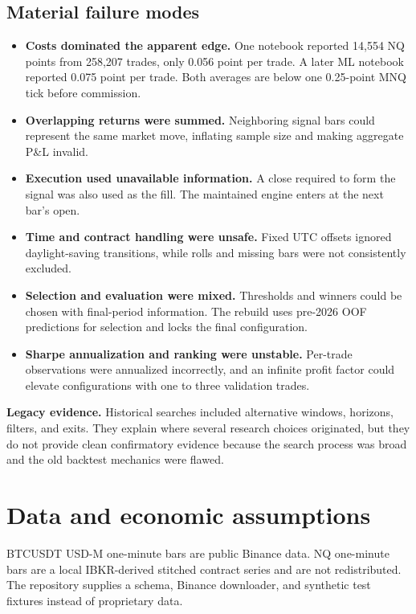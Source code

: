 \documentclass[10pt]{article}
\begin{document}
\subsection*{Material failure modes}
\begin{itemize}
  \item \textbf{Costs dominated the apparent edge.} One notebook reported 14,554 NQ points from 258,207 trades, only 0.056 point per trade. A later ML notebook reported 0.075 point per trade. Both averages are below one 0.25-point MNQ tick before commission.
  \item \textbf{Overlapping returns were summed.} Neighboring signal bars could represent the same market move, inflating sample size and making aggregate P\&L invalid.
  \item \textbf{Execution used unavailable information.} A close required to form the signal was also used as the fill. The maintained engine enters at the next bar's open.
  \item \textbf{Time and contract handling were unsafe.} Fixed UTC offsets ignored daylight-saving transitions, while rolls and missing bars were not consistently excluded.
  \item \textbf{Selection and evaluation were mixed.} Thresholds and winners could be chosen with final-period information. The rebuild uses pre-2026 OOF predictions for selection and locks the final configuration.
  \item \textbf{Sharpe annualization and ranking were unstable.} Per-trade observations were annualized incorrectly, and an infinite profit factor could elevate configurations with one to three validation trades.
\end{itemize}

\begin{limitationbox}
\textbf{Legacy evidence.} Historical searches included alternative windows, horizons, filters, and exits. They explain where several research choices originated, but they do not provide clean confirmatory evidence because the search process was broad and the old backtest mechanics were flawed.
\end{limitationbox}

\section{Data and economic assumptions}
BTCUSDT USD-M one-minute bars are public Binance data. NQ one-minute bars are a local IBKR-derived stitched contract series and are not redistributed. The repository supplies a schema, Binance downloader, and synthetic test fixtures instead of proprietary data.
\end{document}
